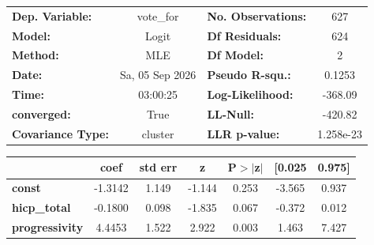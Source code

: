 \begin{center}
\begin{tabular}{lclc}
\toprule
\textbf{Dep. Variable:}   &    vote\_for    & \textbf{  No. Observations:  } &      627    \\
\textbf{Model:}           &      Logit      & \textbf{  Df Residuals:      } &      624    \\
\textbf{Method:}          &       MLE       & \textbf{  Df Model:          } &        2    \\
\textbf{Date:}            & Sa, 05 Sep 2026 & \textbf{  Pseudo R-squ.:     } &   0.1253    \\
\textbf{Time:}            &     03:00:25    & \textbf{  Log-Likelihood:    } &   -368.09   \\
\textbf{converged:}       &       True      & \textbf{  LL-Null:           } &   -420.82   \\
\textbf{Covariance Type:} &     cluster     & \textbf{  LLR p-value:       } & 1.258e-23   \\
\bottomrule
\end{tabular}
\begin{tabular}{lcccccc}
                       & \textbf{coef} & \textbf{std err} & \textbf{z} & \textbf{P$> |$z$|$} & \textbf{[0.025} & \textbf{0.975]}  \\
\midrule
\textbf{const}         &      -1.3142  &        1.149     &    -1.144  &         0.253        &       -3.565    &        0.937     \\
\textbf{hicp\_total}   &      -0.1800  &        0.098     &    -1.835  &         0.067        &       -0.372    &        0.012     \\
\textbf{progressivity} &       4.4453  &        1.522     &     2.922  &         0.003        &        1.463    &        7.427     \\
\bottomrule
\end{tabular}
\end{center}